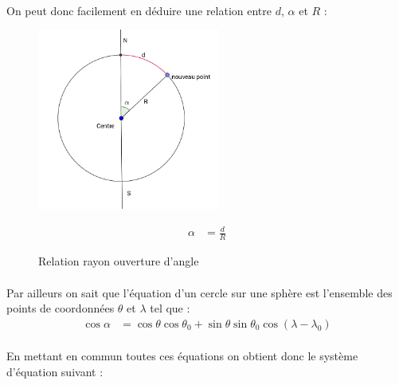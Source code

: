 \documentclass[a4paper]{report}
\begin{document}
\paragraph{} On peut donc facilement en déduire une relation entre $d$, $\alpha$ et $R$ :

\begin{figure}[H]
	\begin{minipage}[c]{.46\linewidth}
		\begin{center}
			\includegraphics[width=6cm]{image/relation_angle_rayon}
       			\caption{Relation rayon ouverture d'angle}
			\label{Relation rayon ouverture d'angle}
		\end{center}
	\end{minipage} \hfill
	\begin{minipage}[c]{.46\linewidth}
		\begin{align}
			\alpha &= \frac{d}{R}
		\end{align}
	\end{minipage}
\end{figure}	

\paragraph{} Par ailleurs on sait que l'équation d'un cercle sur une sphère est l'ensemble des points de coordonnées $\theta$ et $\lambda$ tel que \cite{ref_cercle_sphere}:
\begin{align}
	\cos\alpha &= \cos\theta\cos\theta_{0} + \sin\theta\sin\theta_{0}\cos(\lambda - \lambda_{0})
\end{align}

\paragraph{} En mettant en commun toutes ces équations on obtient donc le système d'équation suivant :
\end{document}
